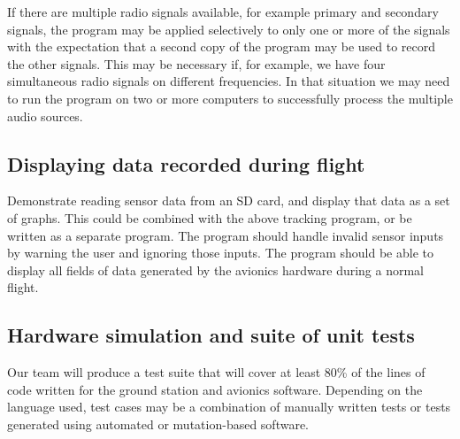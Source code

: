 \documentclass[onecolumn, draftclsnofoot,10pt, compsoc]{IEEEtran}
\begin{document}
If there are multiple radio signals available, for example primary and secondary signals, the program may be applied selectively to only one or more of the signals with the expectation that a second copy of the program may be used to record the other signals.  This may be necessary if, for example, we have four simultaneous radio signals on different frequencies.  In that situation we may need to run the program on two or more computers to successfully process the multiple audio sources.

\subsection{Displaying data recorded during flight}
Demonstrate reading sensor data from an SD card, and display that data as a set of graphs.  This could be combined with the above tracking program, or be written as a separate program.  The program should handle invalid sensor inputs by warning the user and ignoring those inputs.  The program should be able to display all fields of data generated by the avionics hardware during a normal flight.

\subsection{Hardware simulation and suite of unit tests}
Our team will produce a test suite that will cover at least 80\% of the lines of code written for the ground station and avionics software.  Depending on the language used, test cases may be a combination of manually written tests or tests generated using automated or mutation-based software.
\end{document}
